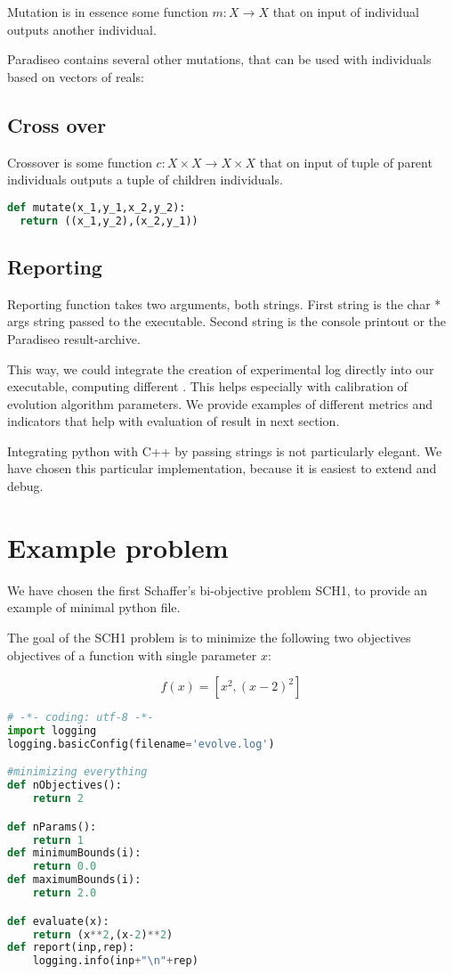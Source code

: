 \documentclass[12pt,oneside]{fithesis2}
\begin{document}
Mutation is in essence some function $m:X \to X$ that on input of individual outputs another individual.

Paradiseo contains several other mutations, that can be used with individuals based on vectors of reals:

\subsection{Cross over}
Crossover is some function $c:X \times X \to X \times X$ that on input of tuple of parent individuals outputs a tuple of children individuals. 
\begin{lstlisting}[language=Python,label=cross_example,caption=Crossover example]
def mutate(x_1,y_1,x_2,y_2):
  return ((x_1,y_2),(x_2,y_1))
\end{lstlisting}

\subsection{Reporting}

Reporting function takes two arguments, both strings. First string is the char * args string passed to the executable. Second string is the console printout or the Paradiseo result-archive.

This way, we could integrate the creation of experimental log directly into our executable, computing different . This helps especially with calibration of evolution algorithm parameters.
We provide examples of different metrics and indicators that help with evaluation of result in next section.

Integrating python with C++ by passing strings is not particularly elegant. We have chosen this particular implementation, because it is easiest to extend and debug.

\section{Example problem}

We have chosen the first Schaffer's bi-objective problem SCH1, to provide an example of minimal python file.

The goal of the SCH1 problem is to minimize the following two objectives objectives of a function with single parameter $x$:

$$f(x) = [x^2,(x-2)^2]$$

\begin{lstlisting}[language=Python,label=min_example,caption=Minimal working example]
# -*- coding: utf-8 -*-
import logging
logging.basicConfig(filename='evolve.log')

#minimizing everything 
def nObjectives():
	return 2

def nParams():
	return 1
def minimumBounds(i):
	return 0.0
def maximumBounds(i):
	return 2.0

def evaluate(x):
	return (x**2,(x-2)**2)
def report(inp,rep):
	logging.info(inp+"\n"+rep) 
\end{lstlisting}
\end{document}
